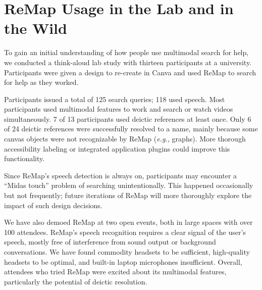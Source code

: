 \section{ReMap Usage in the Lab and in the Wild}
To gain an initial understanding of how people use multimodal search for help, we conducted a think-aloud lab study with thirteen participants at a university. Participants were given a design to re-create in Canva and used ReMap to search for help as they worked.

Participants issued a total of 125 search queries; 118 used speech. Most participants used multimodal features to work and search or watch videos simultaneously.
7 of 13 participants used deictic references at least once. Only 6 of 24 deictic references were successfully resolved to a name, mainly because some canvas objects were not recognizable by ReMap (\textit{e.g.,} graphs). More thorough accessibility labeling or integrated application plugins could improve this functionality.

Since ReMap's speech detection is always on, participants may encounter a ``Midas touch'' problem \cite{Jacob1990} of searching unintentionally. This happened occasionally but not frequently; future iterations of ReMap will more thoroughly explore the impact of such design decisions.


We have also demoed ReMap at two open events, both in large spaces with over 100 attendees. ReMap's speech recognition requires a clear signal of the user's speech, mostly free of interference from sound output or background conversations. We have found commodity headsets to be sufficient, high-quality headsets to be optimal, and built-in laptop microphones insufficient. Overall, attendees who tried ReMap were excited about its multimodal features, particularly the potential of deictic resolution.